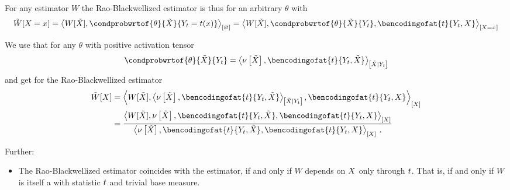 \documentclass[aps,onecolumn,nofootinbib,pra]{article}
\begin{document}
    For any estimator $W$ the Rao-Blackwellized estimator is thus for an arbitrary $\theta$ with
    \begin{align*}
        \tilde{W}[\indexedcatvariable]
        = \contraction{W[\tilde{\catvariable}],\condprobwrtof{\theta}{\tilde{\catvariable}}{\headvariableof{\sstat}=\sstat(\catindex)}}
        = \contractionof{W[\tilde{\catvariable}],\condprobwrtof{\theta}{\tilde{\catvariable}}{\headvariableof{\sstat}},\bencodingofat{\sstat}{\headvariableof{\sstat},\catvariable}}{\indexedcatvariable}
    \end{align*}

    We use that for any $\theta$ with positive activation tensor
    \begin{align*}
        \condprobwrtof{\theta}{\tilde{\catvariable}}{\headvariableof{\sstat}}
        = \normalizationofwrt{\basemeasureat{\tilde{\catvariable}},\bencodingofat{\sstat}{\headvariableof{\sstat},\tilde{\catvariable}}}{\tilde{\catvariable}}{\headvariableof{\sstat}}
    \end{align*}
    and get for the Rao-Blackwellized estimator
    \begin{align*}
        \tilde{W}[\catvariable]
        &= \contractionof{W[\tilde{\catvariable}],\normalizationofwrt{\basemeasureat{\tilde{\catvariable}},\bencodingofat{\sstat}{\headvariableof{\sstat},\tilde{\catvariable}}}{\tilde{\catvariable}}{\headvariableof{\sstat}},\bencodingofat{\sstat}{\headvariableof{\sstat},\catvariable}}{\catvariable} \\
        &= \frac{
        \contractionof{W[\tilde{\catvariable}],\basemeasureat{\tilde{\catvariable}},\bencodingofat{\sstat}{\headvariableof{\sstat},\tilde{\catvariable}},\bencodingofat{\sstat}{\headvariableof{\sstat},\catvariable}}{\catvariable}
        }{
        \contractionof{\basemeasureat{\tilde{\catvariable}},\bencodingofat{\sstat}{\headvariableof{\sstat},\tilde{\catvariable}},\bencodingofat{\sstat}{\headvariableof{\sstat},\catvariable}}{\catvariable} \, .
        }
    \end{align*}

    Further:
    \begin{itemize}
        \item The Rao-Blackwellized estimator coincides with the estimator, if and only if $W$ depends on $X$ only through $t$.
        That is, if and only if $W$ is itself a \ComputationActivationNetwork{} with statistic $t$ and trivial base measure.
    \end{itemize}
\end{document}

